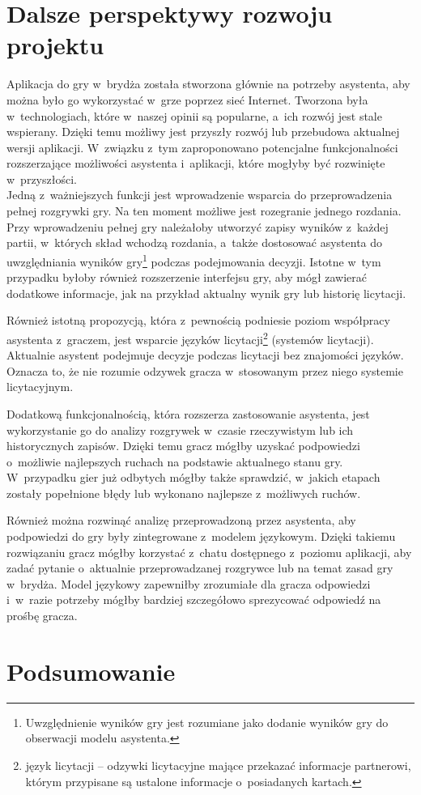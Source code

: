 \FloatBarrier

\section{Dalsze perspektywy rozwoju projektu}

Aplikacja do gry w~brydża została stworzona głównie
na potrzeby asystenta, aby można było go wykorzystać w~grze
poprzez sieć Internet. Tworzona była w~technologiach, które
w~naszej opinii są popularne, a~ich rozwój jest stale wspierany.
Dzięki temu możliwy jest przyszły rozwój lub przebudowa aktualnej
wersji aplikacji.
W~związku z~tym zaproponowano potencjalne funkcjonalności rozszerzające
możliwości asystenta i~aplikacji, które
mogłyby być rozwinięte w~przyszłości. \\

Jedną z~ważniejszych funkcji jest wprowadzenie wsparcia do
przeprowadzenia pełnej rozgrywki gry. Na ten moment możliwe jest
rozegranie jednego rozdania. Przy wprowadzeniu pełnej gry należałoby
utworzyć zapisy wyników z~każdej partii, w~których skład wchodzą rozdania,
a~także dostosować asystenta
do uwzględniania wyników gry\footnote{Uwzględnienie wyników gry jest
  rozumiane jako dodanie wyników gry do obserwacji modelu asystenta.}
podczas podejmowania decyzji. Istotne w~tym przypadku
byłoby również rozszerzenie interfejsu gry, aby mógł zawierać
dodatkowe informacje, jak na przykład aktualny wynik gry lub
historię licytacji.

Również istotną propozycją, która z~pewnością podniesie poziom
współpracy asystenta z~graczem, jest wsparcie języków licytacji\footnote{
  język licytacji -- odzywki licytacyjne mające przekazać informacje
  partnerowi, którym przypisane
  są ustalone informacje o~posiadanych kartach.
} (systemów licytacji).
Aktualnie asystent podejmuje decyzje podczas licytacji bez znajomości
języków. Oznacza to, że nie rozumie odzywek gracza w~stosowanym przez
niego systemie licytacyjnym.

Dodatkową funkcjonalnością, która rozszerza zastosowanie asystenta, jest
wykorzystanie go do analizy rozgrywek w~czasie rzeczywistym lub
ich historycznych zapisów. Dzięki temu gracz mógłby uzyskać podpowiedzi
o~możliwie najlepszych ruchach na podstawie aktualnego stanu gry.
W~przypadku gier już odbytych mógłby także sprawdzić, w~jakich etapach
zostały popełnione błędy lub wykonano najlepsze z~możliwych ruchów.

Również można rozwinąć analizę przeprowadzoną przez asystenta, aby
podpowiedzi do gry były zintegrowane z~modelem językowym. Dzięki
takiemu rozwiązaniu gracz mógłby korzystać z~chatu dostępnego
z~poziomu aplikacji, aby zadać pytanie o~aktualnie przeprowadzanej
rozgrywce lub na temat zasad gry w~brydża. Model językowy zapewniłby
zrozumiałe dla gracza odpowiedzi i~w~razie potrzeby mógłby bardziej
szczegółowo sprezycować odpowiedź na prośbę gracza.

\section{Podsumowanie}


